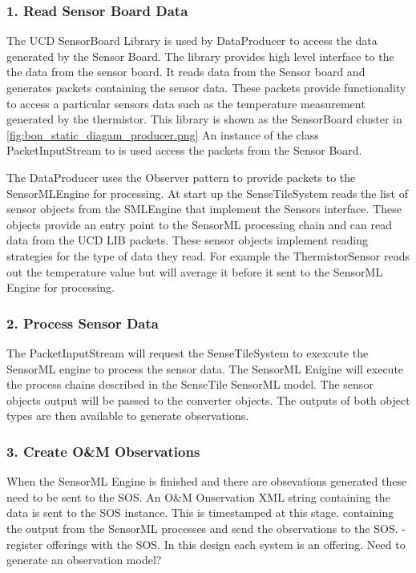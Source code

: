 \documentclass[]{final_report}
\begin{document}
\subsubsection {1. Read Sensor Board Data}

The UCD SensorBoard Library is used by DataProducer to access
the data generated by the Sensor Board.
The library provides high level interface to the
the data from the sensor board. It reads data from the Sensor board and generates packets
containing the sensor data. These packets provide functionality
to access a particular sensors data such as the temperature
measurement generated by the thermistor. 
This library is shown as the SensorBoard cluster in \ref{fig:bon_static_diagam_producer.png}
An instance of the class PacketInputStream to is used access the packets from the Sensor Board.

The DataProducer uses the Observer pattern to provide
packets to the SensorMLEngine for processing.
At start up the SenseTileSystem reads the list of sensor objects from the SMLEngine that
implement the Sensors interface. These objects provide an entry point
to the SensorML processing chain and can read data from the UCD LIB packets.
These sensor objects implement reading strategies for the type of data they read. 
For example the ThermistorSensor reads out the temperature value
but will average it before it sent to the SensorML Engine for processing.

\subsubsection {2. Process Sensor Data}
The PacketInputStream will request the SenseTileSystem to exexcute
the SensorML engine to process the sensor data. The SensorML Enigine
will execute the process chains described in the SenseTile SensorML model.
The sensor objects output will be passed to the converter objects. The
outputs of both object types are then available to generate observations.

\subsubsection {3. Create O\&M Observations}

When the SensorML Engine is finished
and there are obsevations generated these
need to be sent to the SOS. An O\&M Onservation
XML string containing the data is sent to
the SOS instance. This is timestamped at
this stage.
 containing the output from
the SensorML processes and send the observations
to the SOS.
-register offerings with the SOS. In this design
each system is an offering.
Need to generate an observation model?
\end{document}
